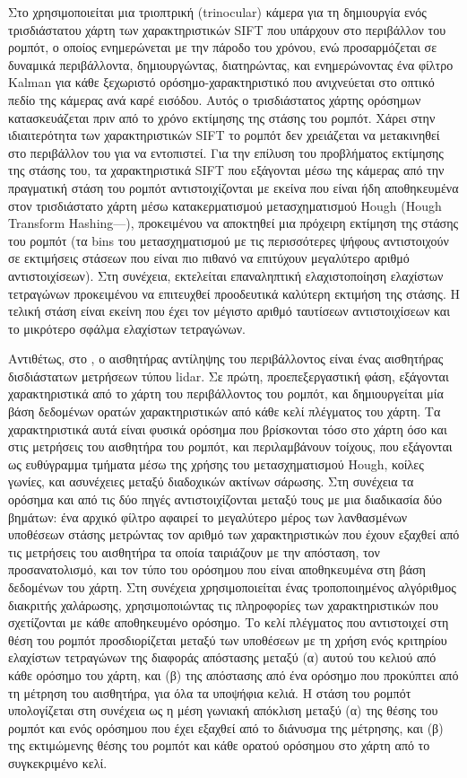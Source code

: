 Στο \cite{Se} χρησιμοποιείται μια τριοπτρική (trinocular) κάμερα για τη
δημιουργία ενός τρισδιάστατου χάρτη των χαρακτηριστικών SIFT που υπάρχουν στο
περιβάλλον του ρομπότ, ο οποίος ενημερώνεται με την πάροδο του χρόνου, ενώ
προσαρμόζεται σε δυναμικά περιβάλλοντα, δημιουργώντας, διατηρώντας, και
ενημερώνοντας ένα φίλτρο Kalman για κάθε ξεχωριστό ορόσημο-χαρακτηριστικό που
ανιχνεύεται στο οπτικό πεδίο της κάμερας ανά καρέ εισόδου. Αυτός ο
τρισδιάστατος χάρτης ορόσημων κατασκευάζεται πριν από το χρόνο εκτίμησης της
στάσης του ρομπότ. Χάρει στην ιδιαιτερότητα των χαρακτηριστικών SIFT το ρομπότ
δεν χρειάζεται να μετακινηθεί στο περιβάλλον του για να εντοπιστεί. Για την
επίλυση του προβλήματος εκτίμησης της στάσης του, τα χαρακτηριστικά SIFT που
εξάγονται μέσω της κάμερας από την πραγματική στάση του ρομπότ αντιστοιχίζονται
με εκείνα που είναι ήδη αποθηκευμένα στον τρισδιάστατο χάρτη μέσω
κατακερματισμού μετασχηματισμού Hough (Hough Transform
Hashing---\cite{Hough1960}), προκειμένου να αποκτηθεί μια πρόχειρη εκτίμηση της
στάσης του ρομπότ (τα bins του μετασχηματισμού με τις περισσότερες ψήφους
αντιστοιχούν σε εκτιμήσεις στάσεων που είναι πιο πιθανό να επιτύχουν μεγαλύτερο
αριθμό αντιστοιχίσεων). Στη συνέχεια, εκτελείται επαναληπτική ελαχιστοποίηση
ελαχίστων τετραγώνων προκειμένου να επιτευχθεί προοδευτικά καλύτερη εκτιμήση
της στάσης. Η τελική στάση είναι εκείνη που έχει τον μέγιστο αριθμό ταυτίσεων
αντιστοιχίσεων και το μικρότερο σφάλμα ελαχίστων τετραγώνων.

Αντιθέτως, στο \cite{Hernandez-alamilla2006}, ο αισθητήρας αντίληψης του
περιβάλλοντος είναι ένας αισθητήρας δισδιάστατων μετρήσεων τύπου lidar. Σε
πρώτη, προεπεξεργαστική φάση, εξάγονται χαρακτηριστικά από το χάρτη του
περιβάλλοντος του ρομπότ, και δημιουργείται μία βάση δεδομένων ορατών
χαρακτηριστικών από κάθε κελί πλέγματος του χάρτη. Τα χαρακτηριστικά αυτά είναι
φυσικά ορόσημα που βρίσκονται τόσο στο χάρτη όσο και στις μετρήσεις του
αισθητήρα του ρομπότ, και περιλαμβάνουν τοίχους, που εξάγονται ως ευθύγραμμα
τμήματα μέσω της χρήσης του μετασχηματισμού Hough, κοίλες γωνίες, και
ασυνέχειες μεταξύ διαδοχικών ακτίνων σάρωσης. Στη συνέχεια τα ορόσημα και από
τις δύο πηγές αντιστοιχίζονται μεταξύ τους με μια διαδικασία δύο βημάτων: ένα
αρχικό φίλτρο αφαιρεί το μεγαλύτερο μέρος των λανθασμένων υποθέσεων στάσης
μετρώντας τον αριθμό των χαρακτηριστικών που έχουν εξαχθεί από τις μετρήσεις
του αισθητήρα τα οποία ταιριάζουν με την απόσταση, τον προσανατολισμό, και τον
τύπο του ορόσημου που είναι αποθηκευμένα στη βάση δεδομένων του χάρτη. Στη
συνέχεια χρησιμοποιείται ένας τροποποιημένος αλγόριθμος διακριτής χαλάρωσης,
χρησιμοποιώντας τις πληροφορίες των χαρακτηριστικών που σχετίζονται με κάθε
αποθηκευμένο ορόσημο. Το κελί πλέγματος που αντιστοιχεί στη θέση του ρομπότ
προσδιορίζεται μεταξύ των υποθέσεων με τη χρήση ενός κριτηρίου ελαχίστων
τετραγώνων της διαφοράς απόστασης μεταξύ (α) αυτού του κελιού από κάθε ορόσημο
του χάρτη, και (β) της απόστασης από ένα ορόσημο που προκύπτει από τη μέτρηση
του αισθητήρα, για όλα τα υποψήφια κελιά.  Η στάση του ρομπότ υπολογίζεται στη
συνέχεια ως η μέση γωνιακή απόκλιση μεταξύ (α) της θέσης του ρομπότ και ενός
ορόσημου που έχει εξαχθεί από το διάνυσμα της μέτρησης, και (β) της εκτιμώμενης
θέσης του ρομπότ και κάθε ορατού ορόσημου στο χάρτη από το συγκεκριμένο κελί.

